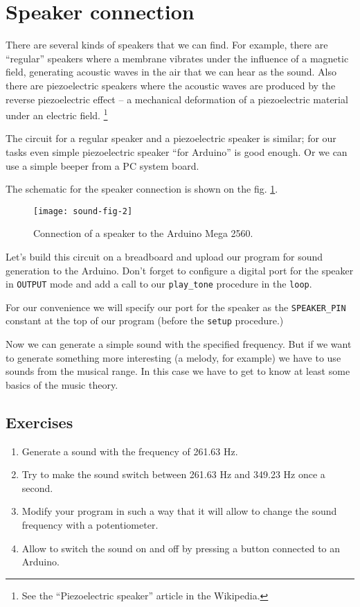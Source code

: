 \documentclass[../sparc.tex]{subfiles}
\begin{document}
\section{Speaker connection}

There are several kinds of speakers that we can find.  For example, there are
``regular'' speakers where a membrane vibrates under the influence of a magnetic
field, generating acoustic waves in the air that we can hear as the sound.  Also
there are piezoelectric speakers where the acoustic waves are produced by the
reverse piezoelectric effect -- a mechanical deformation of a piezoelectric
material under an electric field. \footnote{See the ``Piezoelectric speaker''
article in the Wikipedia.}

The circuit for a regular speaker and a piezoelectric speaker is similar; for
our tasks even simple piezoelectric speaker ``for Arduino'' is good enough. Or
we can use a simple beeper from a PC system board.

The schematic for the speaker connection is shown on the
fig. \ref{fig:sound-fig-2}.

\begin{figure}[h]
  \centering
  \texttt{[image: sound-fig-2]}
  \caption{Connection of a speaker to the Arduino Mega 2560.}
  \label{fig:sound-fig-2}
\end{figure}

Let's build this circuit on a breadboard and upload our program for sound
generation to the Arduino.  Don't forget to configure a digital port for the
speaker in \texttt{OUTPUT} mode and add a call to our \texttt{play\_tone}
procedure in the \texttt{loop}.

For our convenience we will specify our port for the speaker as the
\texttt{SPEAKER\_PIN} constant at the top of our program (before the
\texttt{setup} procedure.)

Now we can generate a simple sound with the specified frequency.  But if we want
to generate something more interesting (a melody, for example) we have to use
sounds from the musical range.  In this case we have to get to know at least
some basics of the music theory.

\subsection{Exercises}
\begin{enumerate}
\item Generate a sound with the frequency of 261.63 Hz.
\item Try to make the sound switch between 261.63 Hz and 349.23 Hz once a
  second.
\item Modify your program in such a way that it will allow to change the sound
  frequency with a potentiometer.
\item Allow to switch the sound on and off by pressing a button connected to an
  Arduino.
\end{enumerate}
\end{document}
